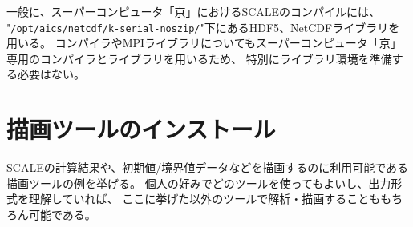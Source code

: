 一般に、スーパーコンピュータ「京」におけるSCALEのコンパイルには、\\
\noindent "\verb|/opt/aics/netcdf/k-serial-noszip/|"下にあるHDF5、NetCDFライブラリを用いる。
コンパイラやMPIライブラリについてもスーパーコンピュータ「京」専用のコンパイラとライブラリを用いるため、
特別にライブラリ環境を準備する必要はない。



\section{描画ツールのインストール}
\label{sec:env_vis_tools}

SCALEの計算結果や、初期値/境界値データなどを描画するのに利用可能である描画ツールの例を挙げる。
個人の好みでどのツールを使ってもよいし、出力形式を理解していれば、
ここに挙げた以外のツールで解析・描画することももちろん可能である。

